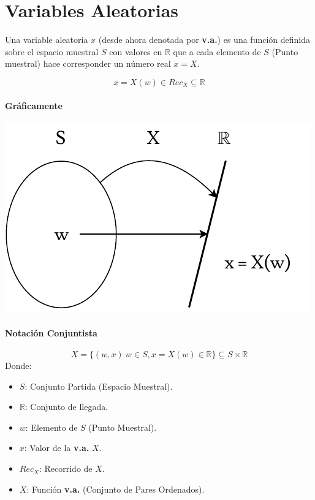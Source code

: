 \chapter{Variables Aleatorias}
Una variable aleatoria $x$ (desde ahora denotada por \textbf{v.a.}) es una función definida sobre el espacio muestral $S$ con valores en $\mathbb{R}$ que a cada elemento de $S$ (Punto muestral) hace corresponder un número real $x=X$.

$$x=X(w) \in Rec_X \subseteq \mathbb{R}$$ 
\subsubsection{Gráficamente}

\begin{center}
\includegraphics[scale=0.75]{cap1.pdf}
\end{center}

\subsubsection{Notación Conjuntista}
$$X = \lbrace (w,x)\ w\in S, x=X(w)\in \mathbb{R} \rbrace \subseteq S\times  \mathbb{R}$$
Donde:
\begin{itemize}
\item $S$: Conjunto Partida (Espacio Muestral).
\item $\mathbb{R}$: Conjunto de llegada.
\item $w$: Elemento de $S$ (Punto Muestral).
\item $x$: Valor de la \textbf{v.a.} $X$.
\item $Rec_X$: Recorrido de $X$.
\item $X$: Función \textbf{v.a.} (Conjunto de Pares Ordenados).
\end{itemize}
